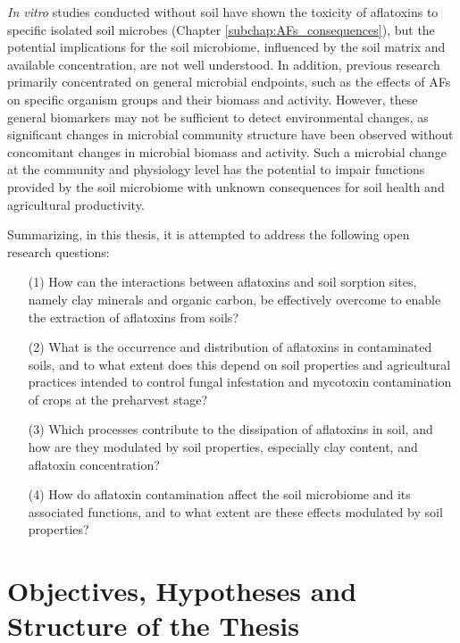 \textit{In vitro} studies conducted without soil have shown the toxicity of aflatoxins to specific isolated soil microbes (Chapter \ref{subchap:AFs_consequences}), but the potential implications for the soil microbiome, influenced by the soil matrix and available concentration, are not well understood. In addition, previous research primarily concentrated on general microbial endpoints, such as the effects of AFs on specific organism groups and their biomass and activity. However, these general biomarkers may not be sufficient to detect environmental changes, as significant changes in microbial community structure have been observed without concomitant changes in microbial biomass and activity. Such a microbial change at the community and physiology level has the potential to impair functions provided by the soil microbiome with unknown consequences for soil health and agricultural productivity. 


Summarizing, in this thesis, it is attempted to address the following open research questions:

\begin{itemize}
\item[(1)] How can the interactions between aflatoxins and soil sorption sites, namely clay minerals and organic carbon, be effectively overcome to enable the extraction of aflatoxins from soils? 
\item[(2)] What is the occurrence and distribution of aflatoxins in contaminated soils, and to what extent does this depend on soil properties and agricultural practices intended to control fungal infestation and mycotoxin contamination of crops at the preharvest stage?
\item[(3)] Which processes contribute to the dissipation of aflatoxins in soil, and how are they modulated by soil properties, especially clay content, and aflatoxin concentration? 
\item[(4)] How do aflatoxin contamination affect the soil microbiome and its associated functions, and to what extent are these effects modulated by soil properties? 
\end{itemize}


\section{Objectives, Hypotheses and Structure of the Thesis}

